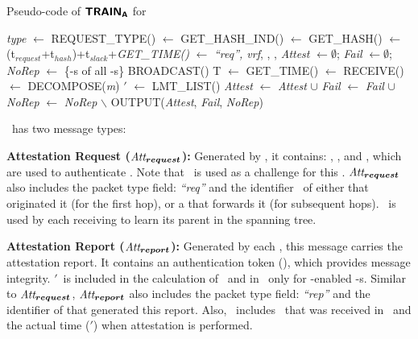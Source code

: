 \begin{algorithm}[hbt!]
\footnotesize
\caption{Pseudo-code of $\boldsymbol{{\sf{TRAIN_{A}}}}$ for \vrf}\label{alg:rtc_vrf}
    \begin{algorithmic}[1]
        \State \textit{type} $\gets$ REQUEST\_TYPE() 
        \State \hashind $\gets$ GET\_HASH\_IND()
        \State \hash $\gets$ GET\_HASH(\hashind)
        \State \attesttime $\gets$ \netheight*(t$_{request}$+t$_{hash}$)+t$_{slack}$+\textit{GET\_TIME()}
        \State \Attreq $\gets$ \textit{``req'', vrf}, \hashind, \hash, \attesttime
        \State \textit{Attest} $\gets \emptyset$; \textit{Fail} $\gets \emptyset$; \textit{NoRep} $\gets$ \{\devid-s of all \prv-s\}
        \State BROADCAST(\Attreq)
        \State T $\gets$ GET\_TIME()
             \State \Attrep $\gets$ RECEIVE()
             \State [\devid, \parent, \attesttime, \hash, \lmt, \Authrep] $\gets$ DECOMPOSE(\textit{\textit{m}})
             \State \lmt$'$ $\gets$ LMT\_LIST(\devid) 
                     \State \textit{Attest} $\gets$ \textit{Attest} $\cup$ \devid
                 \Else
                     \State \textit{Fail} $\gets$ \textit{Fail} $\cup$ \devid
                 \EndIf
             \State \textit{NoRep} $\gets$ \textit{NoRep} $\backslash$ \devid
             \EndIf
        \EndWhile
        \State OUTPUT(\textit{Attest}, \textit{Fail}, \textit{NoRep})
    \EndWhile
    \end{algorithmic}
\end{algorithm} 

\trapsrtc\ has two message types:

\noindent \textbf{Attestation Request ($\boldsymbol{\textit{Att$_{request}$}}$):} Generated by \vrf, 
it contains: \hash, \hashind, and \attesttime, which are used to authenticate \Attreq. Note that \hash\ 
is used as a challenge for this \sa. $\boldsymbol{\textit{Att$_{request}$}}$ also includes
the packet type field: \textit{``req''} and the identifier \snd\ of either \vrf 
that originated it (for the first hop), or a \prv that forwards it (for subsequent hops).
\snd\ is used by each receiving \prv to learn its parent in the spanning tree.

\noindent \textbf{Attestation Report ($\boldsymbol{\textit{Att$_{report}$}}$):} Generated by each \prv, this 
message carries the attestation report. It contains an authentication token (\Authrep), which provides message integrity. 
\lmt$'$\ is included in the calculation of \Authrep\ and in \Attrep\ only for \rata-enabled \prv-s. 
Similar to $\boldsymbol{\textit{Att$_{request}$}}$, $\boldsymbol{\textit{Att$_{report}$}}$
also includes the packet type field: \textit{``rep''}  and the identifier of \prv that generated 
this report. Also, \Attrep\ includes \hash\ that was received in \Attreq\ and the actual time 
(\attesttime$'$) when attestation is performed.

